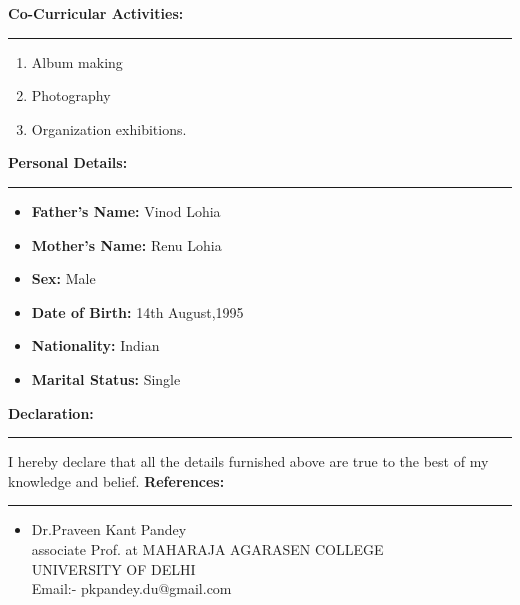 \documentclass[a4paper,10pt]{article}
\begin{document}
\begin{flushleft}
  \textbf{\large Co-Curricular Activities:}\\
  \hrule
  \begin{enumerate}
  	\item Album making\\
  	\item Photography\\
  	\item Organization exhibitions.\\
  \end{enumerate}
  \textbf{\large Personal Details:}\\
   \hrule
    \begin{itemize}
    	\item  \textbf{Father's Name:} Vinod Lohia\\
    	\item  \textbf{Mother's Name:} Renu Lohia\\
    	\item  \textbf{Sex:} Male\\
    	\item  \textbf{Date of Birth:} 14th August,1995\\
    	\item  \textbf{Nationality:}   Indian\\
    	\item  \textbf{Marital Status:}  Single\\
    \end{itemize}
     \textbf{ \large Declaration: }\\
      \hrule
      \bigskip 
     I hereby declare that all the details furnished above are true to the best of my knowledge and belief.
     \medskip
      \textbf{ \large References: }\\
    \hrule
    \begin{itemize}
    	\item 
    	     Dr.Praveen Kant Pandey\\
    	     associate Prof. at MAHARAJA AGARASEN COLLEGE\\
    	     UNIVERSITY OF DELHI \\
    	     Email:- pkpandey.du@gmail.com
     \end{itemize}
\end{flushleft}
\end{document}
